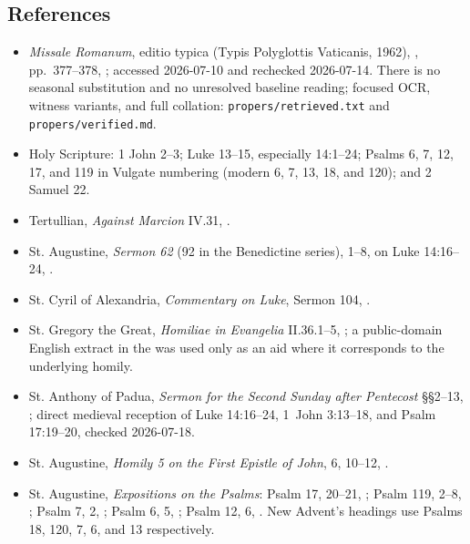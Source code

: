 \begin{deepstudy}
\section*{References}
{\small
\begin{itemize}
\item \emph{Missale Romanum}, editio typica (Typis Polyglottis Vaticanis, 1962), , pp.~377--378, ; accessed 2026-07-10 and rechecked 2026-07-14. There is no seasonal substitution and no unresolved baseline reading; focused OCR, witness variants, and full collation: \nolinkurl{propers/retrieved.txt} and \nolinkurl{propers/verified.md}.
\item Holy Scripture: 1 John 2--3; Luke 13--15, especially 14:1--24; Psalms 6, 7, 12, 17, and 119 in Vulgate numbering (modern 6, 7, 13, 18, and 120); and 2 Samuel 22.
\item Tertullian, \emph{Against Marcion} IV.31, .
\item St. Augustine, \emph{Sermon 62} (92 in the Benedictine series), 1--8, on Luke 14:16--24, .
\item St. Cyril of Alexandria, \emph{Commentary on Luke}, Sermon 104, .
\item St. Gregory the Great, \emph{Homiliae in Evangelia} II.36.1--5, ; a public-domain English extract in the  was used only as an aid where it corresponds to the underlying homily.
\item St. Anthony of Padua, \emph{Sermon for the Second Sunday after Pentecost} §§2--13, ; direct medieval reception of Luke 14:16--24, 1~John 3:13--18, and Psalm 17:19--20, checked 2026-07-18.
\item St. Augustine, \emph{Homily 5 on the First Epistle of John}, 6, 10--12, .
\item St. Augustine, \emph{Expositions on the Psalms}: Psalm 17, 20--21, ; Psalm 119, 2--8, ; Psalm 7, 2, ; Psalm 6, 5, ; Psalm 12, 6, . New Advent's headings use Psalms 18, 120, 7, 6, and 13 respectively.

\end{itemize}}
\end{deepstudy}
